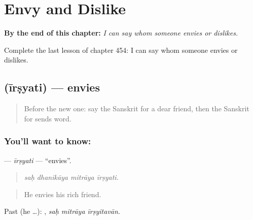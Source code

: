 
\chapter{Envy and Dislike}
\label{ch:sa-envy-and-dislike}

\begin{chapteropening}
\textbf{By the end of this chapter:} \emph{I can say whom someone envies or dislikes.}

Complete the last lesson of chapter 454: I can say whom someone envies or dislikes.
\end{chapteropening}

\section[\texorpdfstring{\sk{ईर्ष्यति} (īrṣyati)}{ईर्ष्यति (īrṣyati)}]{ (īrṣyati) — envies}

\label{lesson:SA-C454-irsyati}



\begin{quote}
Before the new one: say the Sanskrit for a dear friend, then the Sanskrit for sends word.
\end{quote}

\subsection*{You'll want to know: }
\textbf{} — \emph{īrṣyati} — \textquotedblleft{}envies\textquotedblright{}.

\begin{quote}
   
\end{quote}

\begin{quote}
\emph{saḥ dhanikāya mitrāya īrṣyati.}
\end{quote}

\begin{quote}
He envies his rich friend.
\end{quote}

Past (he …):   , \emph{saḥ mitrāya īrṣyitavān}.

